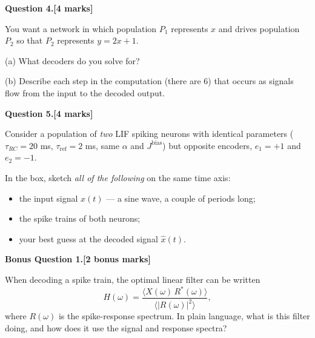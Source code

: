 \documentclass[11pt,letterpaper]{article}
\newcommand{\trc}{\tau_{RC}}
\newcommand{\tref}{\tau_{\mathrm{ref}}}
\newcommand{\question}[2]{\par\vspace{10pt}\textbf{Question #1.}\hfill\textbf{[#2 marks]}\par}
\newcommand{\answerbox}[1]{\par\noindent\framebox[\linewidth]{\rule{0pt}{#1}}\par}
\begin{document}
\noindent{}

\question{4}{4}
You want a network in which population $P_1$ represents $x$ and drives population $P_2$ so that $P_2$ represents $y = 2x + 1$.

(a) What decoders do you solve for?
\vspace{1.6cm}

(b) Describe each step in the computation (there are 6) that occurs as signals flow from the input to the decoded output.
\vspace{3.2cm}

\newpage
\question{5}{4}
Consider a population of \emph{two} LIF spiking neurons with identical parameters ($\trc = 20$ ms, $\tref = 2$ ms, same $\alpha$ and $J^{\mathrm{bias}}$) but opposite encoders, $e_1 = +1$ and $e_2 = -1$.

In the box, sketch \emph{all of the following} on the same time axis:
\begin{itemize}
\item the input signal $x(t)$ --- a sine wave, a couple of periods long;
\item the spike trains of both neurons;
\item your best guess at the decoded signal $\hat x(t)$.
\end{itemize}
\answerbox{6.4cm}

\vspace{6pt}
\textbf{Bonus Question 1.}\hfill\textbf{[2 bonus marks]}\par
When decoding a spike train, the optimal linear filter can be written
\[
H(\omega) = \frac{\langle X(\omega)\,R^*(\omega)\rangle}{\langle |R(\omega)|^2\rangle},
\]
where $R(\omega)$ is the spike-response spectrum. In plain language, what is this filter doing, and how does it use the signal and response spectra?
\vspace{4cm}
\end{document}
